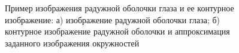 \begin{figure}[!ht]
\center
\caption{Пример изображения радужной оболочки глаза и ее контурное изображение: а) изображение радужной оболочки глаза; б) контурное изображение радужной оболочки и аппроксимация заданного изображения окружностей}
\label{intro:fig1}
\end{figure}


